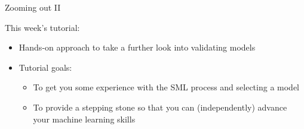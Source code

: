 \documentclass[handout]{beamer}
\begin{document}
\begin{frame}{Zooming out II} 
	
	This week's tutorial:
	\begin{itemize}
		\item Hands-on approach to take a further look into validating models
		\item Tutorial goals:
		\begin{itemize}
			\item To get you some experience with the SML process and selecting a model
			\item To provide a stepping stone so that you can (independently) advance your machine learning skills
		\end{itemize}
		
	\end{itemize}
	
\end{frame}
\end{document}
